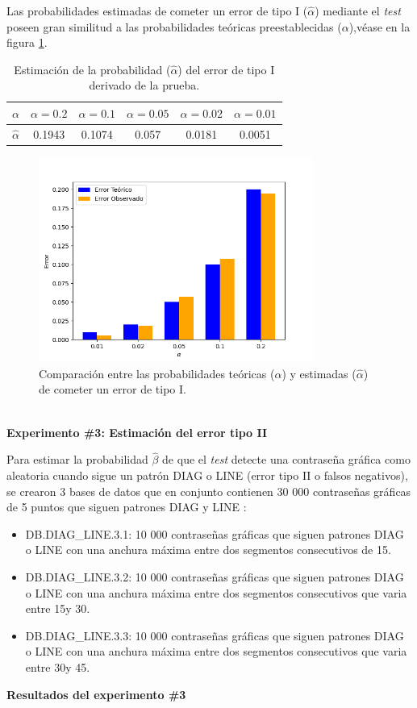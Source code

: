\documentclass[12pt]{report}
\begin{document}
Las probabilidades estimadas de cometer un error de tipo I ($\hat{\alpha}$) mediante el \textit{test} poseen gran similitud  a las probabilidades teóricas preestablecidas ($\alpha$),véase en la figura \ref{Teorico vs Observado3}.
\begin{table}[h!]
	\centering
	\begin{tabular}{|c|ccccc|}
		\hline
		$\alpha$ & $\alpha = 0.2$ & $\alpha = 0.1$ & $\alpha = 0.05$ & $\alpha = 0.02$ & $\alpha = 0.01$ \\
		\hline
		$\hat{\alpha}$ & 0.1943 & 0.1074 & 0.057 & 0.0181 & 0.0051 \\
		\hline
	\end{tabular}
	\caption{Estimación de la probabilidad ($\hat{\alpha}$) del error de tipo I derivado de la prueba.}
	\label{tab3:error1-prob1}
\end{table}
\begin{figure}[ht]
	\centering
	
	\includegraphics[width=0.8\textwidth]{5td_teo_obs.png}
	\caption{Comparación entre las probabilidades teóricas ($\alpha$) y estimadas ($\hat{\alpha}$) de cometer un error de tipo I. }
	\label{Teorico vs Observado3}
\end{figure}\\
\newpage
\textbf{Experimento \#3: Estimación del error tipo II}

Para estimar la probabilidad $\hat{\beta}$ de que el \textit{test} detecte una contraseña gráfica como aleatoria cuando sigue un patrón DIAG o LINE (error tipo II o falsos negativos), se crearon 3 bases de datos que en conjunto contienen 30 000 contraseñas gráficas de 5 puntos que siguen patrones DIAG y LINE :
\begin{itemize}
	\item DB.DIAG\_LINE.3.1: 10 000 contraseñas gráficas que siguen patrones DIAG o LINE con una anchura máxima entre dos segmentos consecutivos de 15\degree. 
	\item DB.DIAG\_LINE.3.2: 10 000 contraseñas gráficas que siguen patrones DIAG o LINE con una anchura máxima entre dos segmentos consecutivos que varia entre 15\degree y 30\degree. 
	\item DB.DIAG\_LINE.3.3: 10 000 contraseñas gráficas que siguen patrones DIAG o LINE con una anchura máxima entre dos segmentos consecutivos que varia entre 30\degree y 45\degree. 
\end{itemize}
\textbf{Resultados del experimento \#3}
\end{document}

